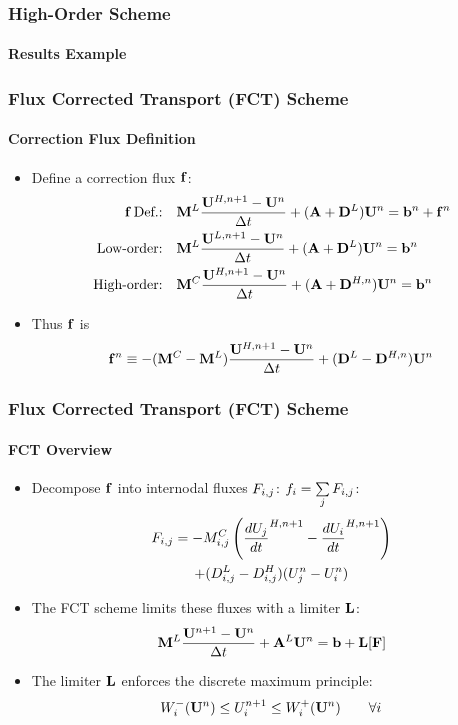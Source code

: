 \documentclass{beamer}
\begin{document}
\begin{frame}
\frametitle{High-Order Scheme}
\framesubtitle{Results Example}


\end{frame}
\begin{frame}
\frametitle{Flux Corrected Transport (FCT) Scheme}
\framesubtitle{Correction Flux Definition}

\begin{itemize}
   \item Define a correction flux $\mathbf{f}$:
   \begin{align*}
      \mathbf{f}\,\mbox{Def.:}\quad   & \mathbf{M}^L\frac{\mathbf{U}^{H,n+1}-\mathbf{U}^n}{\Delta t}+(\mathbf{A}+\mathbf{D}^L)\mathbf{U}^n = \mathbf{b}^n + \mathbf{f}^n\\
      \mbox{Low-order:}\quad  & \mathbf{M}^L\frac{\mathbf{U}^{L,n+1}-\mathbf{U}^n}{\Delta t}+(\mathbf{A} + \mathbf{D}^L)\mathbf{U}^n = \mathbf{b}^n\\
      \mbox{High-order:}\quad & \mathbf{M}^C\frac{\mathbf{U}^{H,n+1}-\mathbf{U}^n}{\Delta t}+(\mathbf{A} + \mathbf{D}^{H,n})\mathbf{U}^n = \mathbf{b}^n
   \end{align*}
   \item Thus $\mathbf{f}$ is
   \begin{equation}
      \mathbf{f}^n \equiv -(\mathbf{M}^C-\mathbf{M}^L)\frac{\mathbf{U}^{H,n+1}-\mathbf{U}^n}{\Delta t} +(\mathbf{D}^L-\mathbf{D}^{H,n})\mathbf{U}^n
   \end{equation}
\end{itemize}

\end{frame}
\begin{frame}
\frametitle{Flux Corrected Transport (FCT) Scheme}
\framesubtitle{FCT Overview}

\begin{itemize}
   \item Decompose $\mathbf{f}$ into internodal fluxes $F_{i,j}$: $f_i = \sum\limits_j F_{i,j}$:
   \begin{multline}
      F_{i,j} = -M_{i,j}^C\left(\frac{dU_j}{dt}^{H,n+1} - \frac{dU_i}{dt}^{H,n+1}\right)\\
      + (D_{i,j}^L-D_{i,j}^H)(U^n_j - U^n_i)
   \end{multline}
   \item The FCT scheme limits these fluxes with a limiter $\mathbf{L}$:
   \begin{equation}
      \mathbf{M}^L\frac{\mathbf{U}^{n+1}-\mathbf{U}^n}{\Delta t} + \mathbf{A}^L\mathbf{U}^n = \mathbf{b} + \mathbf{L}[\mathbf{F}]
   \end{equation}
   \item The limiter $\mathbf{L}$ enforces the discrete maximum principle:
   \begin{equation}
         W_i^-(\mathbf{U}^n)\leq
         U_i^{n+1}\leq
         W_i^+(\mathbf{U}^n)\qquad\forall i
   \end{equation}
\end{itemize}

\end{frame}
\end{document}
